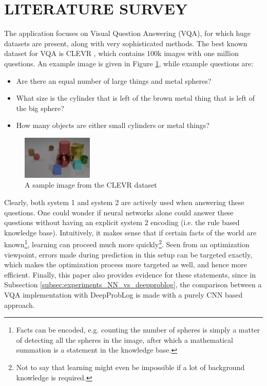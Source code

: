 \documentclass[english]{sobraep}
\begin{document}
\section{LITERATURE SURVEY}
\label{sec:literature_survey}
The application focuses on Visual Question Answering (VQA), for which huge datasets are present, along with very sophisticated methods. The best known dataset for VQA is CLEVR \cite{clevr_dataset}, which contains 100k images with one million questions. An example image is given in Figure \ref{fig:sample_image_clevr}, while example questions are:
\begin{itemize}
    \item Are there an equal number of large things and metal spheres?
    \item What size is the cylinder that is left of the brown metal thing that is left of the big sphere?
    \item How many objects are either small cylinders or metal things?
\end{itemize}

\begin{figure}[htp]
    \begin{center}
    \includegraphics[width=0.3\textwidth]{clevr.jpg}
    \captionsetup{justification=centering}
    \caption{A sample image from the CLEVR dataset \cite{clevr_dataset}}
    \label{fig:sample_image_clevr}
    \end{center}
\end{figure}

Clearly, both system 1 and system 2 are actively used when answering these questions. One could wonder if neural networks alone could answer these questions without having an explicit system 2 encoding (i.e. the rule based knowledge base). Intuitively, it makes sense that if certain facts of the world are known\footnote{Facts can be encoded, e.g. counting the number of spheres is simply a matter of detecting all the spheres in the image, after which a mathematical summation is a statement in the knowledge base.}, learning can proceed much more quickly\footnote{Not to say that learning might even be impossible if a lot of background knowledge is required.}. Seen from an optimization viewpoint, errors made during prediction in this setup can be targeted exactly, which makes the optimization process more targeted as well, and hence more efficient. Finally, this paper also provides evidence for these statements, since in Subsection \ref{subsec:experiments_NN_vs_deepproblog}, the comparison between a VQA implementation with DeepProbLog is made with a purely CNN based approach. 
\end{document}
